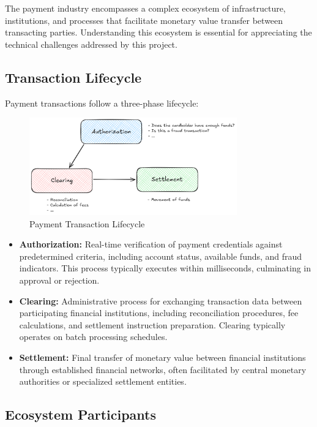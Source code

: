 The payment industry encompasses a complex ecosystem of infrastructure, institutions, and processes that facilitate monetary value transfer between transacting parties. Understanding this ecosystem is essential for appreciating the technical challenges addressed by this project.

\subsection{Transaction Lifecycle}

Payment transactions follow a three-phase lifecycle:

\begin{figure}[H]
    \centering
    \includegraphics[width=0.8\textwidth]{img/Txn_Phases.png}
    \caption{Payment Transaction Lifecycle}
\end{figure}

\begin{itemize}
   \item \textbf{Authorization:} Real-time verification of payment credentials against predetermined criteria, including account status, available funds, and fraud indicators. This process typically executes within milliseconds, culminating in approval or rejection.
   
   \item \textbf{Clearing:} Administrative process for exchanging transaction data between participating financial institutions, including reconciliation procedures, fee calculations, and settlement instruction preparation. Clearing typically operates on batch processing schedules.
   
   \item \textbf{Settlement:} Final transfer of monetary value between financial institutions through established financial networks, often facilitated by central monetary authorities or specialized settlement entities.
\end{itemize}

\subsection{Ecosystem Participants}

